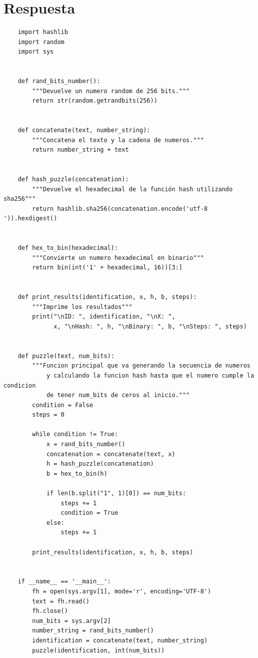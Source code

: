 \documentclass[10pt,a4paper,spanish]{report}
\begin{document}
\section{Respuesta}
\noindent

\begin{verbatim}
	import hashlib
	import random
	import sys


	def rand_bits_number():
	    """Devuelve un numero random de 256 bits."""
	    return str(random.getrandbits(256))


	def concatenate(text, number_string):
	    """Concatena el texto y la cadena de numeros."""
	    return number_string + text


	def hash_puzzle(concatenation):
	    """Devuelve el hexadecimal de la función hash utilizando sha256"""
	    return hashlib.sha256(concatenation.encode('utf-8 ')).hexdigest()


	def hex_to_bin(hexadecimal):
	    """Convierte un numero hexadecimal en binario"""
	    return bin(int('1' + hexadecimal, 16))[3:]


	def print_results(identification, x, h, b, steps):
	    """Imprime los resultados"""
	    print("\nID: ", identification, "\nX: ",
	          x, "\nHash: ", h, "\nBinary: ", b, "\nSteps: ", steps)


	def puzzle(text, num_bits):
	    """Funcion principal que va generando la secuencia de numeros
			y calculando la funcion hash hasta que el numero cumple la condicion
			de tener num_bits de ceros al inicio."""
	    condition = False
	    steps = 0

	    while condition != True:
	        x = rand_bits_number()
	        concatenation = concatenate(text, x)
	        h = hash_puzzle(concatenation)
	        b = hex_to_bin(h)

	        if len(b.split("1", 1)[0]) == num_bits:
	            steps += 1
	            condition = True
	        else:
	            steps += 1

	    print_results(identification, x, h, b, steps)


	if __name__ == '__main__':
	    fh = open(sys.argv[1], mode='r', encoding='UTF-8')
	    text = fh.read()
	    fh.close()
	    num_bits = sys.argv[2]
	    number_string = rand_bits_number()
	    identification = concatenate(text, number_string)
	    puzzle(identification, int(num_bits))
\end{verbatim}

\end{document}
